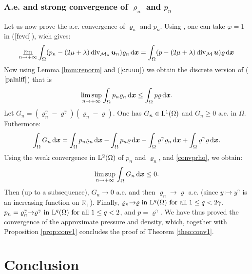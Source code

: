 \documentclass{amsart}
\numberwithin{equation}{section}
\begin{document}
\subsubsection{A.e. and strong convergence of \texorpdfstring{$ {\varrho}_n$ and $p_n$}{Lg}}
Let us now prove the a.e. convergence of ${\varrho}_n$ and $ p_n$.
Using \cite[Lemma 2.1]{eymard2010convergent}, one can take $\varphi=1$ in ($\ref{fevd}$), wich gives:
\begin{equation*}
\lim_{{n {\rightarrow} + \infty}} \int_\Omega (p_n -(2\mu+\lambda)\operatorname{div}_{{{\mathcal M}}_n} {{\boldsymbol u}}_n){\varrho}_n {\, {\rm d}{{\boldsymbol x}}} = \int_\Omega (p-(2\mu+\lambda)\operatorname{div}_{{\mathcal M}} {{\boldsymbol u}}){\varrho} {\, {\rm d}{{\boldsymbol x}}}
\end{equation*}
Now using Lemma \ref{lmm:renorm} and ($\ref{cruun}$) we obtain the discrete version of ($\ref{palnlff}$) that is
\begin{equation}\label{convprho}
\limsup_{{n {\rightarrow} + \infty}} \int_\Omega p_n {\varrho}_n {\, {\rm d}{{\boldsymbol x}}} \le \int_\Omega p {\varrho} {\, {\rm d}{{\boldsymbol x}}}.
\end{equation}
Let $G_n= ( {\varrho}_n^\gamma - {\varrho}^\gamma)( {\varrho}_n - {\varrho})$.
One has $G_n \in  {{\rm L}}^1(\Omega)$ and $G_n \ge 0$ a.e. in $\Omega$.
Futhermore:
\[
\int_\Omega G_n {\, {\rm d}{{\boldsymbol x}}}  = 
\int_\Omega  p_n  {\varrho}_n {\, {\rm d}{{\boldsymbol x}}} - \int_\Omega  p_n {\varrho} {\, {\rm d}{{\boldsymbol x}}}
- \int_\Omega  {\varrho}^\gamma  {\varrho}_n {\, {\rm d}{{\boldsymbol x}}}  + \int_\Omega {\varrho}^\gamma {\varrho} {\, {\rm d}{{\boldsymbol x}}}.
\]
Using the weak convergence in ${{\rm L}^{2}}(\Omega)$ of $p_n$ and $ {\varrho}_n$, and \eqref{convprho}, we obtain:
\[
\limsup_{{n {\rightarrow} + \infty}}  \int_\Omega G_n {\, {\rm d}{{\boldsymbol x}}}  \le 0.
\]
Then (up to a subsequence), $G_n {\rightarrow} 0$ a.e. and then ${\varrho}_n {\rightarrow} {\varrho}$ a.e. (since $y \mapsto y^\gamma$ is an increasing function on ${\mathbb{R}}_+$).
Finally, ${\varrho}_n {\rightarrow} {\varrho} \textrm{ in } {{\rm L}}^q(\Omega) \textrm{ for all } 1 \le q < 2\gamma$, $ p_n= {\varrho}_n^{\gamma}  {\rightarrow} {\varrho}^\gamma \textrm{ in } {{\rm L}}^q(\Omega) \textrm{ for all } 1 \le q < 2$, and $p={\varrho}^\gamma$.
We have thus proved the convergence of the approximate pressure and density, which, together with Proposition \ref{prop:conv1} concludes the proof of Theorem \ref{theo:conv1}.

\section{Conclusion}
\end{document}
